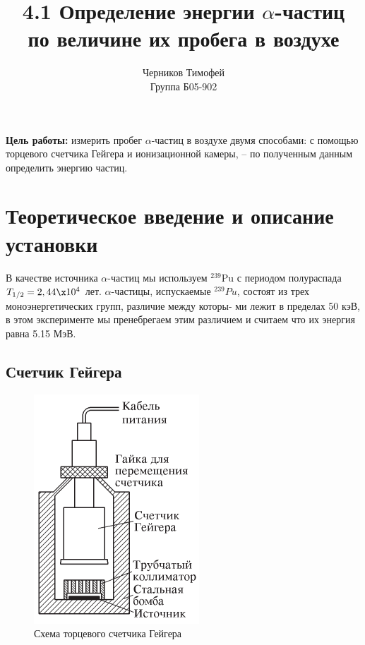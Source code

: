\documentclass[a4paper,12pt]{article} %
\author{Черников Тимофей\\
Группа Б05-902}
\title{4.1 Определение энергии $\alpha$-частиц\\по величине их пробега в воздухе}
\date{\vspace{-10pt}}
\begin{document}
\maketitle
	\textbf{Цель работы:} измерить пробег $\alpha$-частиц в воздухе двумя способами: с помощью торцевого счетчика Гейгера и ионизационной камеры, -- по полученным данным определить энергию частиц.

\section{Теоретическое введение и описание установки}
	
	В качестве источника $\alpha$-частиц мы используем $ ^{239}  $Pu  с периодом полураспада $ T_{1/2} = 2,44 \x 10^4 $ лет. 
	$\alpha$-частицы, испускаемые $ ^{239} Pu $, состоят из трех моноэнергетических групп, различие между которы-
	ми лежит в пределах 50 кэВ, в этом эксперименте мы пренебрегаем этим различием и считаем что их энергия равна 5.15 МэВ.
	
	\subsection{Счетчик Гейгера}
	
	\begin{figure}
		\includegraphics[width=\linewidth]{ustanovka1.pdf}
		\caption{Схема торцевого счетчика Гейгера}
		\label{ris geyger}
	\end{figure}
	
\end{document}
